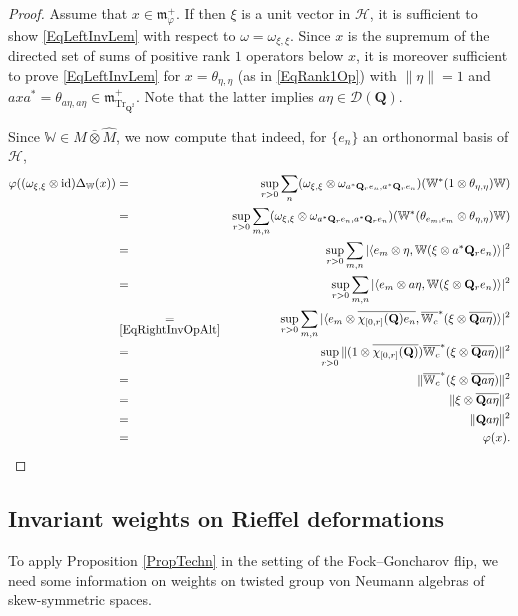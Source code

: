 \documentclass[11pt, reqno]{amsart}
\theoremstyle{definition}
\numberwithin{equation}{section}
\def\msD{\mathscr D}
\def\Hc{\mathcal H}
\newcommand{\Qb}{\mathbf{Q}}
\newcommand{\id}{\mathrm{id}}
\newcommand{\Tr}{\mathrm{Tr}}
\newcommand{\Wbb}{\mathbb{W}}
\newcommand{\wWbb}{\mathbb{W}_c}
\newcommand{\mfm}{\mathfrak{m}}
\begin{document}
\begin{proof}
Assume that $x\in \mfm_\varphi^+$. If then $\xi$ is a unit vector in $\Hc$, it is sufficient to show \eqref{EqLeftInvLem} with respect to $\omega = \omega_{\xi,\xi}$. Since $x$ is the supremum of the directed set of sums of positive rank $1$ operators below $x$, it is moreover sufficient to prove \eqref{EqLeftInvLem} for $x = \theta_{\eta,\eta}$ (as in \eqref{EqRank1Op}) with $\|\eta\|=1$ and $axa^* = \theta_{a\eta,a\eta} \in \mfm_{\Tr_{\Qb^2}}^+$. Note that the latter implies $a\eta\in \msD(\Qb)$.

Since $\Wbb \in M \bar{\otimes} \hat{M}$, we now compute that indeed, for $\{e_n\}$ an orthonormal basis of $\Hc$, 
\begin{eqnarray*}
\varphi((\omega_{\xi,\xi}\otimes \id)\Delta_{\Wbb}(x)) &=& \sup_{r>0} \sum_n (\omega_{\xi,\xi}\otimes \omega_{a^*\Qb_re_n,a^*\Qb_re_n})(\Wbb^*(1\otimes \theta_{\eta,\eta})\Wbb)\\
 &=& \sup_{r>0} \sum_{m,n} (\omega_{\xi,\xi}\otimes \omega_{a^*\Qb_re_n,a^*\Qb_re_n})(\Wbb^*(\theta_{e_m,e_m}\otimes \theta_{\eta,\eta})\Wbb)\\
&=& \sup_{r>0} \sum_{m,n} |\langle e_m \otimes \eta,\Wbb(\xi\otimes a^*\Qb_re_n)\rangle|^2\\
&=& \sup_{r>0} \sum_{m,n} |\langle e_m \otimes a\eta,\Wbb(\xi\otimes \Qb_re_n)\rangle|^2\\
&\underset{\eqref{EqRightInvOpAlt}}{=}& \sup_{r>0} \sum_{m,n} |\langle e_m \otimes \overline{\chi_{[0,r]}(\Qb)e_n},\overline{\wWbb}^*(\xi\otimes \overline{\Qb a\eta})\rangle|^2\\
&=& \sup_{r>0} \|(1\otimes \overline{\chi_{[0,r]}(\Qb)})\overline{\wWbb}^*(\xi\otimes \overline{\Qb a\eta})\|^2 \\
&=&  \|\overline{\wWbb}^*(\xi\otimes \overline{ \Qb a\eta})\|^2 \\
&=& \|\xi\otimes \overline{ \Qb a\eta}\|^2\\
&=& \|\Qb a\eta\|^2\\
&=& \varphi(x). 
\end{eqnarray*}
\end{proof}


\subsection{Invariant weights on Rieffel deformations}



To apply Proposition \ref{PropTechn} in the setting of the Fock--Goncharov flip, we need some information on weights on twisted group von Neumann algebras of skew-symmetric spaces.
\end{document}
